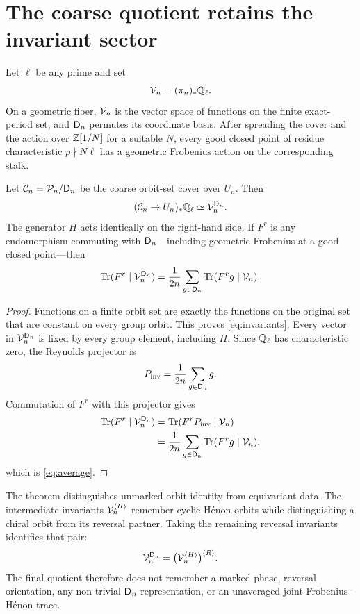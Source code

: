 \section{The coarse quotient retains the invariant sector}\label{sec:chronology}

Let $\ell$ be any prime and set
\begin{equation}
\mathcal V_n=(\pi_n)_*\mathbb Q_\ell.
\end{equation}
On a geometric fiber, $\mathcal V_n$ is the vector space of functions on the finite
exact-period set, and $\mathsf D_n$ permutes its coordinate basis.  After spreading
the cover and the action over $\mathbb Z[1/N]$ for a suitable $N$, every good closed
point of residue characteristic $p\nmid N\ell$ has a geometric Frobenius
action on the corresponding stalk.

\begin{theorem}\label{thm:chronology}
Let $\mathcal C_n=\mathcal P_n/\mathsf D_n$ be the coarse orbit-set cover over $U_n$.  Then
\begin{equation}\label{eq:invariants}
(\mathcal C_n\to U_n)_*\mathbb Q_\ell\simeq\mathcal V_n^{\mathsf D_n}.
\end{equation}
The generator $H$ acts identically on the right-hand side.  If $F^r$ is any
endomorphism commuting with $\mathsf D_n$---including geometric Frobenius at a good
closed point---then
\begin{equation}\label{eq:average}
\operatorname{Tr}(F^r\mid\mathcal V_n^{\mathsf D_n})
=\frac1{2n}\sum_{g\in\mathsf D_n}\operatorname{Tr}(F^rg\mid\mathcal V_n).
\end{equation}
\end{theorem}

\begin{proof}
Functions on a finite orbit set are exactly the functions on the original set
that are constant on every group orbit.  This proves
\eqref{eq:invariants}.  Every vector in $\mathcal V_n^{\mathsf D_n}$ is fixed by every group
element, including $H$.  Since $\mathbb Q_\ell$ has characteristic zero, the Reynolds
projector is
\begin{equation}
P_{\mathrm{inv}}=\frac1{2n}\sum_{g\in\mathsf D_n}g.
\end{equation}
Commutation of $F^r$ with this projector gives
\begin{align}
\operatorname{Tr}(F^r\mid\mathcal V_n^{\mathsf D_n})
&=\operatorname{Tr}(F^rP_{\mathrm{inv}}\mid\mathcal V_n)\\
&=\frac1{2n}\sum_{g\in\mathsf D_n}\operatorname{Tr}(F^rg\mid\mathcal V_n),
\end{align}
which is \eqref{eq:average}.
\end{proof}

The theorem distinguishes unmarked orbit identity from equivariant data.  The
intermediate invariants $\mathcal V_n^{\langle H\rangle}$ remember cyclic H\'enon
orbits while distinguishing a chiral orbit from its reversal partner.  Taking
the remaining reversal invariants identifies that pair:
\begin{equation}
\mathcal V_n^{\mathsf D_n}=\bigl(\mathcal V_n^{\langle H\rangle}\bigr)^{\langle R\rangle}.
\end{equation}
The final quotient therefore does not remember a marked phase, reversal
orientation, any non-trivial $\mathsf D_n$ representation, or an unaveraged joint
Frobenius--H\'enon trace.

